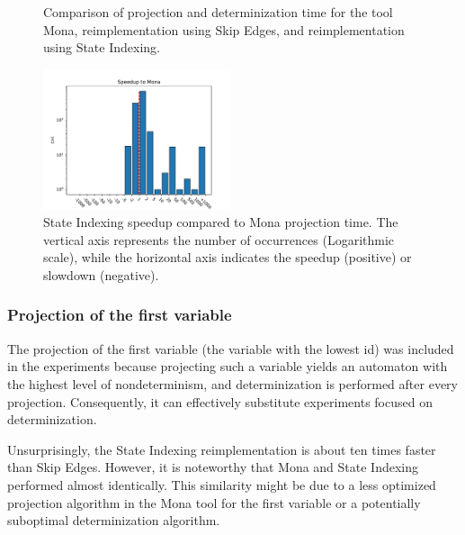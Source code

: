 \documentclass[pdflatex,sn-mathphys-num]{sn-jnl}%
\theoremstyle{thmstyleone}%
\theoremstyle{thmstyletwo}%
\theoremstyle{thmstylethree}%
\begin{document}
\begin{figure}[h!]
\begin{subfigure}{0.49\textwidth}
                \end{subfigure}
                \caption{Comparison of projection and determinization time for the tool Mona, reimplementation using Skip Edges, and reimplementation using State Indexing.}
                \label{figure:projection_last}
            \end{figure}
            \begin{figure}[h!]
                \centering
                \includegraphics[width=0.49\textwidth]{Figures/projection-last-speedup.pdf}
                \caption{State Indexing speedup compared to Mona projection time. The vertical axis represents the number of occurrences (Logarithmic scale), while the horizontal axis indicates the speedup (positive) or slowdown (negative).}
                \label{figure:projection_last_speedup}
            \end{figure}
        \subsubsection*{Projection of the first variable}
            The projection of the first variable (the variable with the lowest id) was included in the experiments because projecting such a variable yields an automaton with the highest level of nondeterminism, and determinization is performed after every projection. Consequently, it can effectively substitute experiments focused on determinization.

            Unsurprisingly, the State Indexing reimplementation is about ten times faster than Skip Edges. However, it is noteworthy that Mona and State Indexing performed almost identically. This similarity might be due to a less optimized projection algorithm in the Mona tool for the first variable or a potentially suboptimal determinization algorithm.

            \newpage
\end{document}
